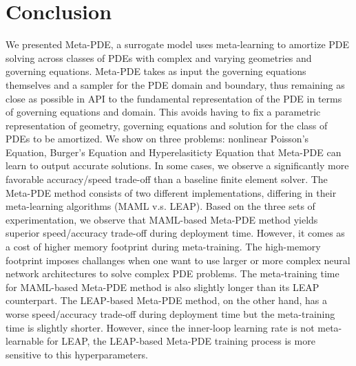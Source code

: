 \section{Conclusion}
We presented Meta-PDE, a surrogate model uses meta-learning to amortize PDE solving across classes of PDEs with complex and varying geometries and governing equations. Meta-PDE takes as input the governing equations themselves and a sampler for the PDE domain and boundary, thus remaining as close as possible in API to the fundamental representation of the PDE in terms of governing equations and domain. This avoids having to fix a parametric representation of geometry, governing equations and solution for the class of PDEs to be amortized. We show on three problems: nonlinear Poisson's Equation, Burger's Equation and Hyperelasiticty Equation that Meta-PDE can learn to output accurate solutions. In some cases, we observe a significantly more favorable accuracy/speed trade-off than a baseline finite element solver. The Meta-PDE method consists of two different implementations, differing in their meta-learning algorithms (MAML v.s. LEAP). Based on the three sets of experimentation, we observe that MAML-based Meta-PDE method yields superior speed/accuracy trade-off during deployment time. However, it comes as a cost of higher memory footprint during meta-training. The high-memory footprint imposes challanges when one want to use larger or more complex neural network architectures to solve complex PDE problems. The meta-training time for MAML-based Meta-PDE method is also slightly longer than its LEAP counterpart. The LEAP-based Meta-PDE method, on the other hand, has a worse speed/accuracy trade-off during deployment time but the meta-training time is slightly shorter. However, since the inner-loop learning rate is not meta-learnable for LEAP, the LEAP-based Meta-PDE training process is more sensitive to this hyperparameters. 